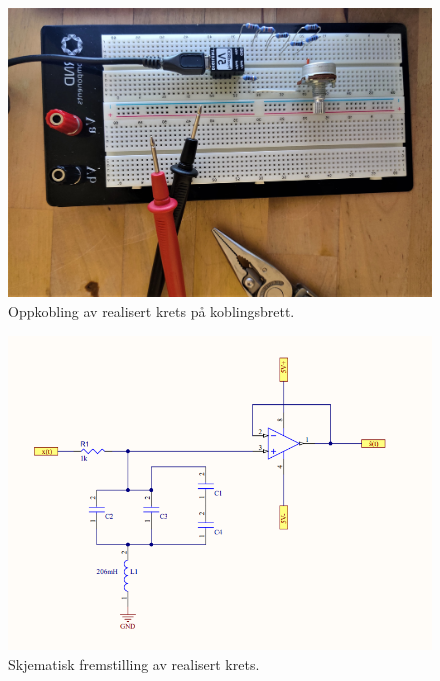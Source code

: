 \documentclass[a4paper,11pt,norsk]{article}
\begin{document}
\begin{figure}[H]
  \centering
  \includegraphics[scale=0.2]{D1/Images/oppkobling.jpg}
  \caption{Oppkobling av realisert krets på koblingsbrett.}
  \label{fig:oppkobling}
\end{figure}

\begin{figure}[H]
  \centering
  \includegraphics[scale=0.95]{D1/Images/Schematic.png}
  \caption{Skjematisk fremstilling av realisert krets.}
  \label{fig:schematic}
\end{figure}
\end{document}
